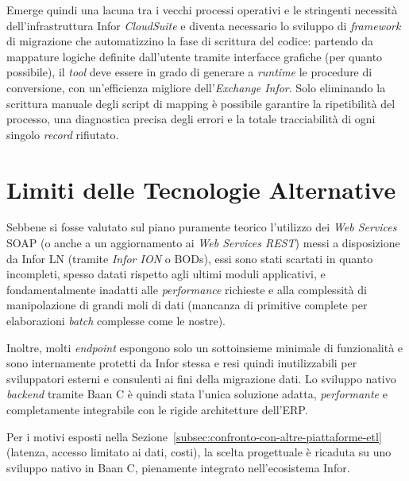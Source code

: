 Emerge quindi una lacuna tra i vecchi processi operativi e le stringenti necessità dell'infrastruttura Infor \textit{CloudSuite} e
diventa necessario lo sviluppo di \textit{framework} di migrazione che automatizzino la fase di scrittura del codice: partendo da mappature logiche
definite dall'utente tramite interfacce grafiche (per quanto possibile), il \textit{tool} deve essere in grado di generare a \textit{runtime} 
le procedure di conversione, con un'efficienza migliore dell'\textit{Exchange Infor}.
Solo eliminando la scrittura manuale degli script di mapping è possibile garantire la ripetibilità del processo,
una diagnostica precisa degli errori e la totale tracciabilità di ogni singolo \textit{record} rifiutato.

\section{Limiti delle Tecnologie Alternative}\label{sec:limiti-delle-tecnologie-alternative}
Sebbene si fosse valutato sul piano puramente teorico l'utilizzo dei \textit{Web Services} SOAP (o anche a un aggiornamento
ai \textit{Web Services REST}) messi a disposizione da Infor LN (tramite \textit{Infor ION} o BODs),
essi sono stati scartati in quanto incompleti, spesso datati rispetto agli ultimi moduli applicativi, e
fondamentalmente inadatti alle \textit{performance} richieste e alla complessità di manipolazione di grandi moli di dati
(mancanza di primitive complete per elaborazioni \textit{batch} complesse come le nostre).

Inoltre, molti \textit{endpoint} espongono solo un sottoinsieme minimale di funzionalità e sono internamente protetti
da Infor stessa e resi quindi inutilizzabili per sviluppatori esterni e consulenti ai fini della migrazione dati.
Lo sviluppo nativo \textit{backend} tramite Baan C è quindi stata l'unica soluzione adatta, \textit{performante} e completamente integrabile con le rigide architetture dell'ERP\@.

Per i motivi esposti nella Sezione~\ref{subsec:confronto-con-altre-piattaforme-etl} (latenza, accesso limitato ai dati, costi),
la scelta progettuale è ricaduta su uno sviluppo nativo in Baan C, pienamente integrato nell'ecosistema Infor.